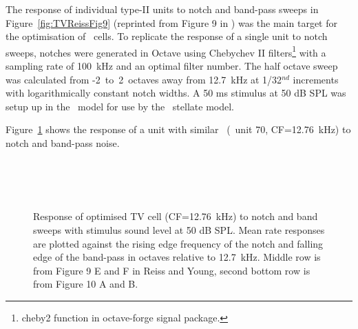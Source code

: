 The response of individual type-II units to notch and band-pass sweeps in
Figure~\ref{fig:TVReissFig9} (reprinted from Figure 9 in
\citep*{ReissYoung:2005}) was the main target for the optimisation of \TV~cells.
To replicate the response of a single unit to notch sweeps, notches were
generated in Octave using Chebychev II filters\footnote{\textsf{cheby2} function
  in octave-forge signal package.}  with a sampling rate of 100~kHz and an
optimal filter number.  The half octave sweep was calculated from
-2~to~2~octaves away from 12.7~kHz at 1/32$^{nd}$ increments with
logarithmically constant notch widths\footnotemark. A 50 ms stimulus at 50 dB
SPL was setup up in the \AN~model for use by the \CN~stellate model.



\smallskip{}


Figure~\ref{fig:TV_SweepUnit70} shows the response of a unit with similar
\CF~(\TV~unit 70, CF=12.76~kHz) to notch and band-pass noise.

\begin{figure}[h!]
  \centering
  \\
  \\
  \\
  \caption[Response of optimised TV cell (CF=12.76~kHz) to notch and band
  sweeps]{Response of optimised TV cell (CF=12.76~kHz) to notch and band sweeps
    with stimulus sound level at 50 dB SPL\@. Mean rate responses are plotted
    against the rising edge frequency of the notch and falling edge of the
    band-pass in octaves relative to 12.7~kHz. Middle row is from Figure 9 E and
    F in Reiss and Young, second bottom row is from Figure 10 A and B. }
  \label{fig:TV_SweepUnit70}
\end{figure}





